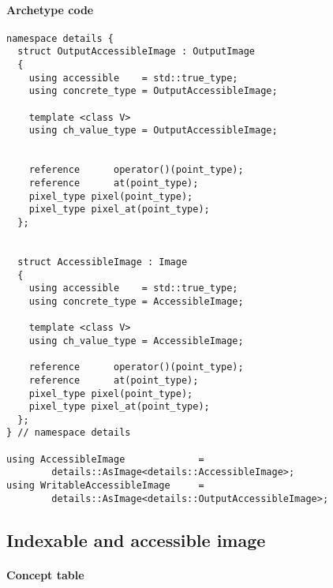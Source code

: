 \paragraph{Archetype code}
\begin{verbatim}
namespace details {
  struct OutputAccessibleImage : OutputImage
  {
    using accessible    = std::true_type;
    using concrete_type = OutputAccessibleImage;

    template <class V>
    using ch_value_type = OutputAccessibleImage;


    reference      operator()(point_type);
    reference      at(point_type);
    pixel_type pixel(point_type);
    pixel_type pixel_at(point_type);
  };


  struct AccessibleImage : Image
  {
    using accessible    = std::true_type;
    using concrete_type = AccessibleImage;

    template <class V>
    using ch_value_type = AccessibleImage;

    reference      operator()(point_type);
    reference      at(point_type);
    pixel_type pixel(point_type);
    pixel_type pixel_at(point_type);
  };
} // namespace details

using AccessibleImage             =
        details::AsImage<details::AccessibleImage>;
using WritableAccessibleImage     =
        details::AsImage<details::OutputAccessibleImage>;
\end{verbatim}


\clearpage

\subsection{Indexable and accessible image}

\paragraph{Concept table}

